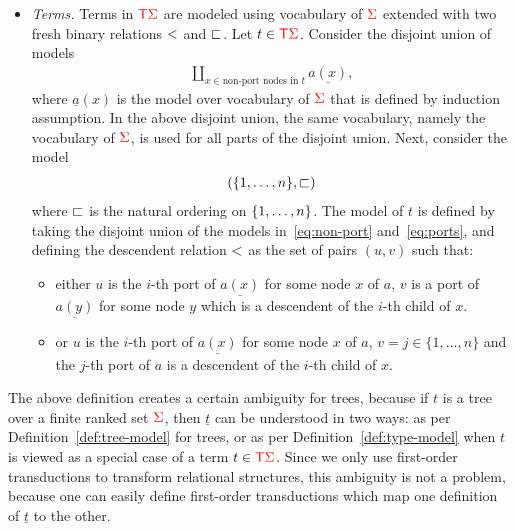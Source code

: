 \begin{definition}
\begin{itemize}
                
        \item \emph{Terms.}   Terms in ${\color{red}{\mathsf T}} {\color{red}{\Sigma}}$ are modeled using vocabulary of ${\color{red}{\Sigma}}$ extended with two fresh binary relations $<$ and $\sqsubset$. 
          Let $t \in {\color{red}{\mathsf T}} {\color{red}{\Sigma}}$. Consider the disjoint union of models
            \begin{align}\label{eq:non-port}
                 \coprod_{x \in \text{non-port nodes in $t$}} \underline{a(x)},
            \end{align}
         where  $\underline a(x)$ is the model over vocabulary of ${\color{red}{\Sigma}}$ that  is defined by induction assumption.   In the above  disjoint union, the same vocabulary, namely the vocabulary of ${\color{red}{\Sigma}}$,  is used  for all parts of the disjoint union. Next, consider  the model
            \begin{align}\label{eq:ports}
            (\{1,\ldots,n\}, \sqsubset)
            \end{align}
            where $\sqsubset$ is the natural ordering on $\{1,\ldots,n\}$. 
            The model of $t$ is defined by taking the disjoint union of the models in~\eqref{eq:non-port} and~\eqref{eq:ports}, and defining the descendent relation $<$ as the set of pairs $(u,v)$ such that:
            \begin{itemize}
            \item either $u$ is the $i$-th port of $\underline{a(x)}$ for some node $x$ of $a$, $v$ is a port of $\underline{a(y)}$ for some node $y$ which is a descendent of the $i$-th child of $x$.
            \item or $u$ is the $i$-th port of $\underline{a(x)}$ for some node $x$ of $a$, $v=j\in\{1,\dots,n\}$ and the $j$-th port of $a$ is a descendent of the $i$-th child of $x$.
            \end{itemize} 

    \end{itemize}
\end{definition}

The above  definition creates a certain ambiguity for trees, because if $t$ is a tree over a finite ranked set ${\color{red}{\Sigma}}$, then $\underline t$ can be understood in two ways: as per  Definition~\ref{def:tree-model} for trees, or as per Definition~\ref{def:type-model} when $t$ is viewed as a special case of a term $t \in {\color{red}{\mathsf T}} {\color{red}{\Sigma}}$. Since we only use first-order transductions to transform relational structures,  this ambiguity is not a problem, because one can easily define first-order transductions which map one definition of $\underline t$ to the other.

